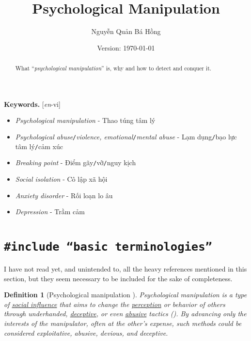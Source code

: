 \documentclass[12pt]{article}
\title{Psychological Manipulation}
\author{Nguyễn Quản Bá Hồng}
\date{\small\textsf{Version: \today}}
\numberwithin{equation}{section}
\newtheorem{definition}{Definition}[section]
\begin{document}
\maketitle
\setcounter{secnumdepth}{6}
\setcounter{tocdepth}{6}


\begin{abstract}
    What ``\textit{psychological manipulation}'' is, why and how to detect and conquer it.
\end{abstract}

\noindent
\textbf{Keywords.} [\textit{en}-vi]
\begin{itemize}
    \setlength\itemsep{0em}
    \item \textit{Psychological manipulation} - Thao túng tâm lý
    \item \textit{Psychological abuse}\texttt{/}\textit{violence, emotional}\texttt{/}\textit{mental abuse} - Lạm dụng\texttt{/}bạo lực tâm lý\texttt{/}cảm xúc
    \item \textit{Breaking point} - Điểm gãy\texttt{/}vỡ\texttt{/}nguy kịch
    \item \textit{Social isolation} - Cô lập xã hội
    \item \textit{Anxiety disorder} - Rối loạn lo âu
    \item \textit{Depression} - Trầm cảm
\end{itemize}

\tableofcontents

\section{\texttt{{\color{RubineRed}\#include} ``basic terminologies''}}
I have not read yet, and unintended to, all the heavy references mentioned in this section, but they seem necessary to be included for the sake of completeness.

\begin{definition}[Psychological manipulation \cite{Psychological Wiki/Psychological manipulation,Wikipedia/Pyschological manipulation}]
    \emph{Psychological manipulation} is a type of \href{https://psychology.wikia.org/wiki/Social_influence}{social influence} that aims to change the \href{https://en.wikipedia.org/wiki/Perception}{perception} or behavior of others through underhanded, \href{https://en.wikipedia.org/wiki/Deceptive}{deceptive}, or even \href{https://psychology.wikia.org/wiki/Abuse}{abusive} tactics (\cite{Braiker2004}). By advancing only the interests of the manipulator, often at the other's expense, such methods could be considered exploitative, abusive, devious, and deceptive.
\end{definition}
\end{document}
